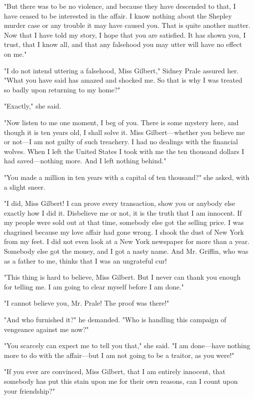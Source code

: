 \documentclass{novel}
\begin{document}
"But there was to be no violence, and because they have descended to that, I have ceased to be interested in the affair. I know nothing about the Shepley murder case or any trouble it may have caused you. That is quite another matter. Now that I have told my story, I hope that you are satisfied. It has shown you, I trust, that I know all, and that any falsehood you may utter will have no effect on me."

"I do not intend uttering a falsehood, Miss Gilbert," Sidney Prale assured her. "What you have said has amazed and shocked me. So that is why I was treated so badly upon returning to my home?"

"Exactly," she said.

"Now listen to me one moment, I beg of you. There is some mystery here, and though it is ten years old, I shall solve it. Miss Gilbert---whether you believe me or not---I am not guilty of such treachery. I had no dealings with the financial wolves. When I left the United States I took with me the ten thousand dollars I had saved---nothing more. And I left nothing behind."

"You made a million in ten years with a capital of ten thousand?" she asked, with a slight sneer.

"I did, Miss Gilbert! I can prove every transaction, show you or anybody else exactly how I did it. Disbelieve me or not, it is the truth that I am innocent. If my people were sold out at that time, somebody else got the selling price. I was chagrined because my love affair had gone wrong. I shook the dust of New York from my feet. I did not even look at a New York newspaper for more than a year. Somebody else got the money, and I got a nasty name. And Mr. Griffin, who was as a father to me, thinks that I was an ungrateful cur!

"This thing is hard to believe, Miss Gilbert. But I never can thank you enough for telling me. I am going to clear myself before I am done."

"I cannot believe you, Mr. Prale! The proof was there!"

"And who furnished it?" he demanded. "Who is handling this campaign of vengeance against me now?"

"You scarcely can expect me to tell you that," she said. "I am done---have nothing more to do with the affair---but I am not going to be a traitor, as you were!"

"If you ever are convinced, Miss Gilbert, that I am entirely innocent, that somebody has put this stain upon me for their own reasons, can I count upon your friendship?"
\end{document}
